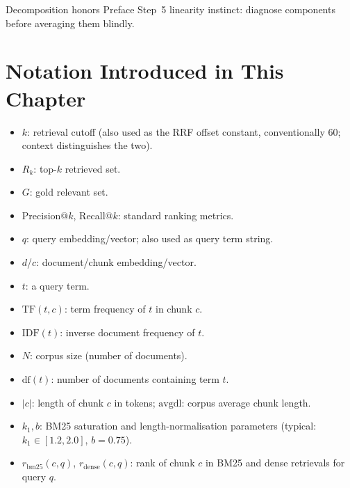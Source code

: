 Decomposition honors Preface Step~5 linearity instinct: diagnose components before averaging them blindly.

\section*{Notation Introduced in This Chapter}
\begin{itemize}[leftmargin=1.5em]
  \item $k$: retrieval cutoff (also used as the RRF offset constant, conventionally 60; context distinguishes the two).
  \item $R_k$: top-$k$ retrieved set.
  \item $G$: gold relevant set.
  \item Precision@$k$, Recall@$k$: standard ranking metrics.
  \item $q$: query embedding/vector; also used as query term string.
  \item $d$/$c$: document/chunk embedding/vector.
  \item $t$: a query term.
  \item $\mathrm{TF}(t,c)$: term frequency of $t$ in chunk $c$.
  \item $\mathrm{IDF}(t)$: inverse document frequency of $t$.
  \item $N$: corpus size (number of documents).
  \item $\mathrm{df}(t)$: number of documents containing term $t$.
  \item $|c|$: length of chunk $c$ in tokens; $\mathrm{avgdl}$: corpus average chunk length.
  \item $k_1, b$: BM25 saturation and length-normalisation parameters (typical: $k_1\in[1.2,2.0]$, $b=0.75$).
  \item $r_{\mathrm{bm25}}(c,q)$, $r_{\mathrm{dense}}(c,q)$: rank of chunk $c$ in BM25 and dense retrievals for query $q$.
\end{itemize}

